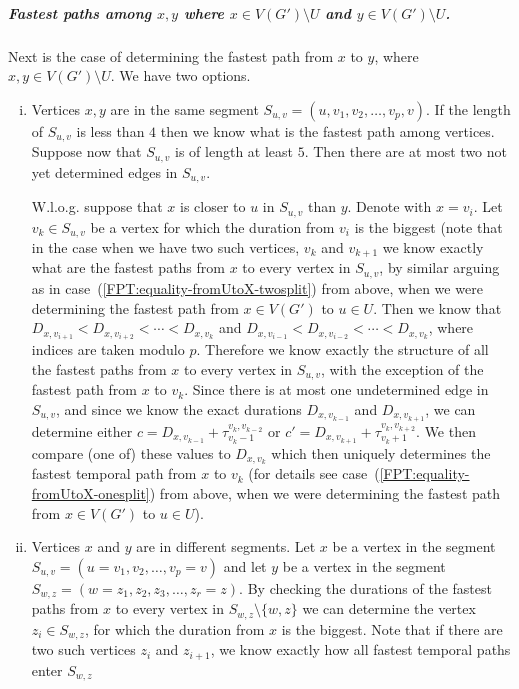 \documentclass[a4paper,UKenglish,cleveref, autoref, thm-restate]{lipics-v2021}
\begin{document}
\subparagraph{\boldmath Fastest paths among $x,y$ where $x \in V(G') \setminus U$ and $y \in V(G') \setminus U$.}
Next is the case of determining the fastest path from $x$ to $y$, where $x,y \in V(G') \setminus U$.
We have two options.
\begin{enumerate}[(i)]
    \item Vertices $x,y$ are in the same segment $S_{u,v} = (u,v_1,v_2, \dots, v_p, v)$. 
    If the length of $S_{u,v}$ is less than $4$ then we know what is the fastest path among vertices.
    Suppose now that $S_{u,v}$ is of length at least $5$. Then there are at most two not yet determined edges in $S_{u,v}$.
    
    W.l.o.g. suppose that $x$ is closer to $u$ in $S_{u,v}$ than $y$.
    Denote with $x = v_i$.
    Let $v_k \in S_{u,v}$ be a vertex for which the duration from $v_i$ is the biggest 
    (note that in the case when we have two such vertices, $v_k$ and $v_{k+1}$ we know exactly what are the fastest paths from $x$ to every vertex in $S_{u,v}$,
    by similar arguing as in case~(\ref{FPT:equality-fromUtoX-twosplit}) from above, when we were determining the fastest path from $x \in V(G')$ to $u \in U$.
    Then we know that $D_{x,v_{i+1}} < D_{x,v_{i+2}} < \cdots  < D_{x,v_{k}}$ and $D_{x,v_{i-1}} < D_{x,v_{i-2}} < \cdots  < D_{x,v_{k}}$, where indices are taken modulo $p$.
    Therefore we know exactly the structure of all the fastest paths from $x$ to every vertex in $S_{u,v}$,
    with the exception of the fastest path from $x$ to $v_k$.
    Since there is at most one undetermined edge in $S_{u,v}$,
    and since we know the exact durations $D_{x,v_{k-1}}$ and $D_{x,v_{k+1}}$,
    we can determine either
    $c = D_{x,v_{k-1}} + \tau _ {v_k-1}^{v_k,v_{k-2}}$ or 
    $c' = D_{x,v_{k+1}} + \tau _ {v_k+1}^{v_k,v_{k+2}}$.
    We then compare (one of) these values to $D_{x,v_k}$ which then 
    uniquely determines the fastest temporal path from $x$ to $v_k$
    (for details see case~(\ref{FPT:equality-fromUtoX-onesplit}) from above, when we were determining the fastest path from $x \in V(G')$ to $u \in U$).
    \item Vertices $x$ and $y$ are in different segments. 
Let $x$ be a vertex in the segment $S_{u,v} = (u=v_1,v_2, \dots, v_p = v)$ and let $y$ be a vertex in the segment $S_{w,z} = (w=z_1, z_2,z_3, \dots, z_r = z)$.
By checking the durations of the fastest paths from $x$ to every vertex in $S_{w,z} \setminus \{w,z\}$
we can determine the vertex $z_i \in S_{w,z} $, for which the duration from $x$ is the biggest.
Note that if there are two such vertices $z_i$ and $z_{i+1}$, we know exactly how all fastest temporal paths enter $S_{w,z}$ 

\end{enumerate}
\end{document}
